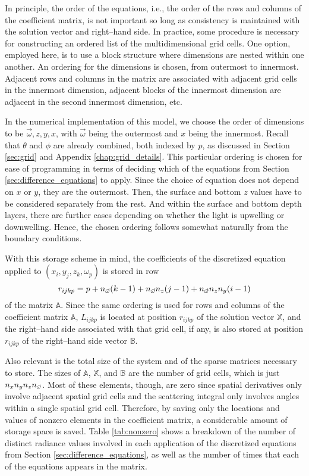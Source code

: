 In principle, the order of the equations, i.e., the order of the rows and columns of the coefficient matrix, is not important
so long as consistency is maintained with the solution vector and right--hand side.
In practice, some procedure is necessary for constructing an ordered list of the multidimensional grid cells.
One option, employed here, is to use a block structure where dimensions are nested within one another.
An ordering for the dimensions is chosen, from outermost to innermost.
Adjacent rows and columns in the matrix are associated with adjacent grid cells in the innermost dimension,
adjacent blocks of the innermost dimension are adjacent in the second innermost dimension, etc.

In the numerical implementation of this model, we choose the order of dimensions to be $\vec{\omega}, z, y, x$, with $\vec{\omega}$ being the outermost and $x$ being the innermost.
Recall that $\theta$ and $\phi$ are already combined, both indexed by $p$, as discussed in Section \ref{sec:grid} and Appendix \ref{chap:grid_details}.
This particular ordering is chosen for ease of programming in terms of deciding which of the equations from Section \ref{sec:difference_equations} to apply.
Since the choice of equation does not depend on $x$ or $y$, they are the outermost.
Then, the surface and bottom $z$ values have to be considered separately from the rest.
And within the surface and bottom depth layers, there are further cases depending on whether the light is upwelling or downwelling.
Hence, the chosen ordering follows somewhat naturally from the boundary conditions.

With this storage scheme in mind, the coefficients of the discretized equation applied to $(x_i, y_j, z_k, \omega_p)$ is stored in row
\begin{equation*}
  r_{ijkp} = p + {n_{\vec{\omega}}} (k-1) + {n_{\vec{\omega}}} n_z (j-1) + {n_{\vec{\omega}}} n_z n_y (i-1)
\end{equation*}
of the matrix $\mathbb{A}$.
Since the same ordering is used for rows and columns of the coefficient matrix $\mathbb{A}$, $L_{ijkp}$ is located at position $r_{ijkp}$ of the solution vector $\mathbb{X}$,
and the right--hand side associated with that grid cell, if any, is also stored at position $r_{ijkp}$ of the right--hand side vector $\mathbb{B}$.

Also relevant is the total size of the system and of the sparse matrices necessary to store.
The sizes of $\mathbb{A}$, $\mathbb{X}$, and $\mathbb{B}$ are the number of grid cells, which is just $n_xn_yn_z{n_{\vec{\omega}}}$.
Most of these elements, though, are zero since spatial derivatives only involve adjacent spatial grid cells and the scattering integral only involves angles within a single spatial grid cell.
Therefore, by saving only the locations and values of nonzero elements in the coefficient matrix, a considerable amount of storage space is saved.
Table \ref{tab:nonzero} shows a breakdown of the number of distinct radiance values involved in each application of the discretized equations from Section \ref{sec:difference_equations}, as well as the number of times that each of the equations appears in the matrix.

